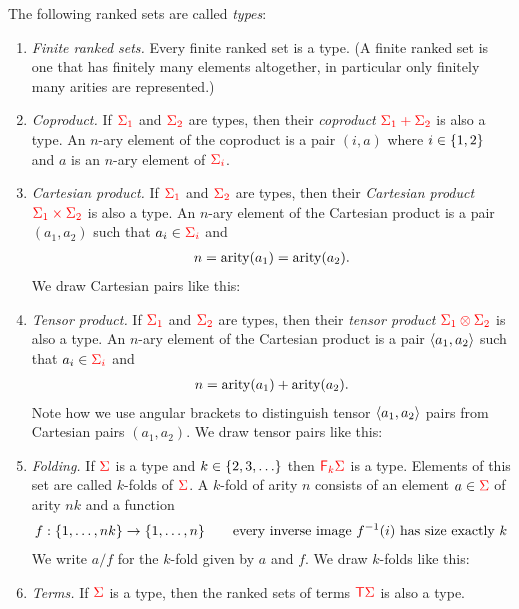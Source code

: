 \begin{definition}[Types] \label{def:types} The following ranked sets are called \emph{types}:
    \begin{enumerate}
        \item  \emph{Finite ranked sets.} Every finite  ranked set is a type. (A finite ranked set is one that  has finitely many elements altogether, in particular only finitely many arities are represented.)
        \item \emph{Coproduct.} If ${\color{red}{\Sigma_1}}$ and ${\color{red}{\Sigma_2}}$ are types, then  their \emph{coproduct} ${\color{red}{\Sigma_1 + \Sigma_2}}$
        is also a type. An $n$-ary element of the coproduct is a pair $(i,a)$ where $i \in \{1,2\}$ and $a$ is an $n$-ary element of  ${\color{red}{\Sigma_i}}$. 
        \item \emph{Cartesian product.} If ${\color{red}{\Sigma_1}}$ and ${\color{red}{\Sigma_2}}$ are types, then  their \emph{Cartesian product}
        $ {\color{red}{\Sigma_1 \times \Sigma_2}}$
        is also a type. An $n$-ary element of the Cartesian product is a pair $(a_1,a_2)$ such that $a_i \in {\color{red}{\Sigma_i}}$ and 
        \begin{align*}
            n = \mathrm{arity}(a_1) = \mathrm{arity}(a_2).
        \end{align*}
        We draw Cartesian pairs like this:
        \item \emph{Tensor product.} If ${\color{red}{\Sigma_1}}$ and ${\color{red}{\Sigma_2}}$ are types, then  their \emph{tensor product}
        $ {\color{red}{\Sigma_1 \otimes \Sigma_2}}$
        is also a type. An $n$-ary element of the Cartesian product is a pair $\langle{a_1,a_2}\rangle$ such that $a_i \in {\color{red}{\Sigma_i}}$ and 
        \begin{align*}
            n = \mathrm{arity}(a_1) + \mathrm{arity}(a_2).
        \end{align*}
        Note how we use  angular brackets to distinguish tensor $\langle{a_1,a_2}\rangle$ pairs from Cartesian pairs $(a_1,a_2)$.         We draw tensor pairs like this:

        \item \emph{Folding.} If ${\color{red}{\Sigma}}$ is a type and $k \in \{2,3,\ldots\}$ then ${\color{red}{\mathsf F_{k}}}{\color{red}{\Sigma}}$ is a type. Elements of this set are called $k$-folds of ${\color{red}{\Sigma}}$. A $k$-fold of arity $n$ consists of an element   $a \in {\color{red}{\Sigma}}$ of arity $nk$ and  a function
        \begin{align*}
            f : \{1,\ldots,nk\} \to \{1,\ldots,n\} \qquad \text{every inverse image $f^{-1}(i)$ has size exactly $k$}
        \end{align*}
        We write $a/f$ for the $k$-fold given by $a$ and $f$.  We draw $k$-folds like this:
        \item \emph{Terms.} If ${\color{red}{\Sigma}}$ is a type, then  the ranked sets of terms  ${\color{red}{\mathsf T}} {\color{red}{\Sigma}}$ is also a type.
    \end{enumerate}
\end{definition}


